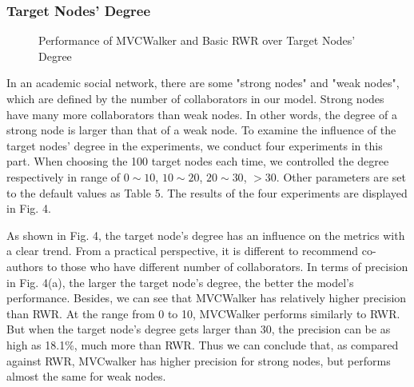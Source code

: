 \documentclass[10pt,journal,compsoc]{IEEEtran}
\begin{document}
\subsubsection{Target Nodes' Degree}

\begin{figure}
\centering
{}
\caption{Performance of MVCWalker and Basic RWR over Target Nodes' Degree}
\label{fig:4}       %
\end{figure}
In an academic social network, there are some "strong nodes" and "weak nodes", which are defined by the number of collaborators in our model. Strong nodes have many more collaborators than weak nodes. In other words, the degree of a strong node is larger than that of a weak node. To examine the influence of the target nodes' degree in the experiments, we conduct four experiments in this part. When choosing the 100 target nodes each time, we controlled the degree respectively in range of $0\sim10$, $10\sim20$, $20\sim30$, $>30$. Other parameters are set to the default values as Table 5. The results of the four experiments are displayed in Fig. 4.

As shown in Fig. 4, the target node's degree has an influence on the metrics with a clear trend. From a practical perspective, it is different to recommend co-authors to those who have different number of collaborators. In terms of precision in Fig. 4(a), the larger the target node's degree, the better the model's performance. Besides, we can see that MVCWalker has relatively higher precision than RWR. At the range from 0 to 10, MVCWalker performs similarly to RWR. But when the target node's degree gets larger than 30, the precision can be as high as 18.1\%, much more than RWR. Thus we can conclude that, as compared against RWR, MVCwalker has higher precision for strong nodes, but performs almost the same for weak nodes.
\end{document}
